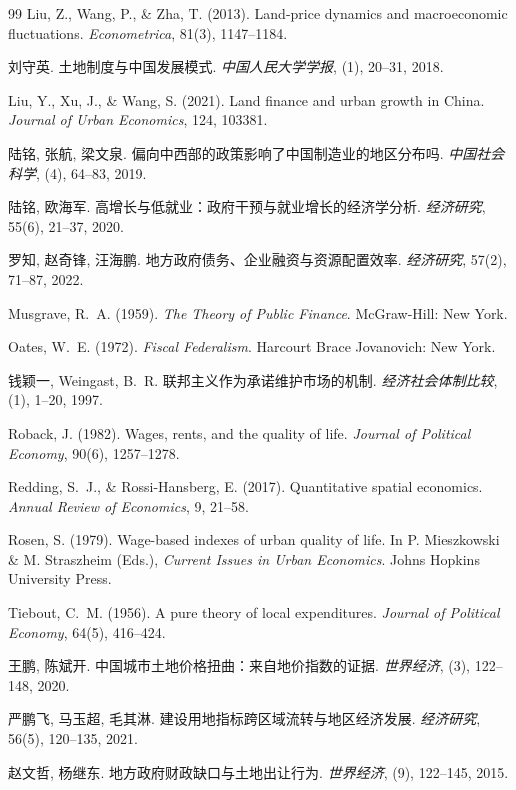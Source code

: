 \documentclass[UTF8,a4paper,12pt]{ctexart}
\theoremstyle{plain}
\theoremstyle{definition}
\theoremstyle{remark}
\begin{document}
\begin{thebibliography}{99}
Liu, Z., Wang, P., \& Zha, T. (2013).
Land-price dynamics and macroeconomic fluctuations.
\textit{Econometrica}, 81(3), 1147--1184.

刘守英.
土地制度与中国发展模式.
\textit{中国人民大学学报}, (1), 20--31, 2018.

Liu, Y., Xu, J., \& Wang, S. (2021).
Land finance and urban growth in China.
\textit{Journal of Urban Economics}, 124, 103381.

陆铭, 张航, 梁文泉.
偏向中西部的政策影响了中国制造业的地区分布吗.
\textit{中国社会科学}, (4), 64--83, 2019.

陆铭, 欧海军.
高增长与低就业：政府干预与就业增长的经济学分析.
\textit{经济研究}, 55(6), 21--37, 2020.

罗知, 赵奇锋, 汪海鹏.
地方政府债务、企业融资与资源配置效率.
\textit{经济研究}, 57(2), 71--87, 2022.

Musgrave, R.~A. (1959).
\textit{The Theory of Public Finance}.
McGraw-Hill: New York.

Oates, W.~E. (1972).
\textit{Fiscal Federalism}.
Harcourt Brace Jovanovich: New York.

钱颖一, Weingast, B.~R.
联邦主义作为承诺维护市场的机制.
\textit{经济社会体制比较}, (1), 1--20, 1997.

Roback, J. (1982).
Wages, rents, and the quality of life.
\textit{Journal of Political Economy}, 90(6), 1257--1278.

Redding, S.~J., \& Rossi-Hansberg, E. (2017).
Quantitative spatial economics.
\textit{Annual Review of Economics}, 9, 21--58.

Rosen, S. (1979).
Wage-based indexes of urban quality of life.
In P. Mieszkowski \& M. Straszheim (Eds.),
\textit{Current Issues in Urban Economics}.
Johns Hopkins University Press.

Tiebout, C.~M. (1956).
A pure theory of local expenditures.
\textit{Journal of Political Economy}, 64(5), 416--424.

王鹏, 陈斌开.
中国城市土地价格扭曲：来自地价指数的证据.
\textit{世界经济}, (3), 122--148, 2020.

严鹏飞, 马玉超, 毛其淋.
建设用地指标跨区域流转与地区经济发展.
\textit{经济研究}, 56(5), 120--135, 2021.

赵文哲, 杨继东.
地方政府财政缺口与土地出让行为.
\textit{世界经济}, (9), 122--145, 2015.

\end{thebibliography}
\end{document}
